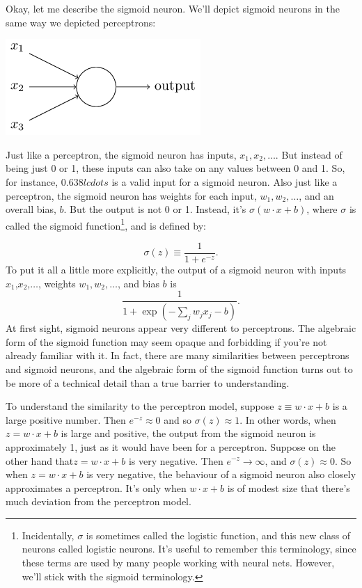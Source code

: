 \documentclass[a4paper,twoside,10pt]{book}
\begin{document}
Okay, let me describe the sigmoid neuron. We'll depict sigmoid neurons in the same way we depicted perceptrons:
\begin{center}
	\includegraphics[scale=0.5]{./figures/ch1/tikz9}
\end{center}	
Just like a perceptron, the sigmoid neuron has inputs, $x_1, x_2, \ldots$. But instead of being just 0 or 1, these inputs can also take on any values between 0 and 1. So, for instance, $0.638lcdots$ is a valid input for a sigmoid neuron. Also just like a perceptron, the sigmoid neuron has weights for each input, $w_1,w_2,\ldots$, and an overall bias, $b$. But the output is not 0 or 1. Instead, it's $\sigma(w⋅x+b)$, where $\sigma$ is called the sigmoid function\footnote{Incidentally, $\sigma$ is sometimes called the logistic function, and this new class of neurons called logistic neurons. It's useful to remember this terminology, since these terms are used by many people working with neural nets. However, we'll stick with the sigmoid terminology.}, and is defined by:

\begin{equation}
\sigma(z) \equiv \frac1{1+e^{-z}}.
\label{eq:sigma}
\end{equation}
To put it all a little more explicitly, the output of a sigmoid neuron with inputs $x_1$,$x_2$,$\ldots$, weights $w_1,w_2,\ldots$, and bias $b$ is
\begin{equation}
\frac1{1+\exp\left(-\sum_jw_jx_j-b\right)}
\label{eq:4}.
\end{equation}
At first sight, sigmoid neurons appear very different to perceptrons. The algebraic form of the sigmoid function may seem opaque and forbidding if you're not already familiar with it. In fact, there are many similarities between perceptrons and sigmoid neurons, and the algebraic form of the sigmoid function turns out to be more of a technical detail than a true barrier to understanding.

To understand the similarity to the perceptron model, suppose $z\equiv w\cdot x+b$ is a large positive number. Then $e^{-z}\approx0$ and so $\sigma(z)\approx 1$. In other words, when $z=w\cdot x+b$ is large and positive, the output from the sigmoid neuron is approximately 1, just as it would have been for a perceptron. Suppose on the other hand that$z=w\cdot x+b$ is very negative. Then $e^{-z}\to\infty$, and $\sigma(z)\approx0$. So when $z=w\cdot x+b$ is very negative, the behaviour of a sigmoid neuron also closely approximates a perceptron. It's only when $w\cdot x+b$ is of modest size that there's much deviation from the perceptron model.
\end{document}
